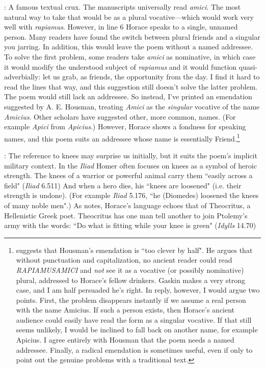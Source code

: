 : A famous textual crux.  The manuscripts universally read
\textit{amici}.  The most natural way to take that would be as a plural
vocative---which would work very well with \textit{rapiamus}.  However, in line
6 Horace speaks to a single, unnamed person.  Many readers have found the
switch between plural friends and a singular you jarring.  In addition, this
would leave the poem without a named addressee.  To solve the first problem,
some readers take \textit{amici} as nominative, in which case it would modify
the understood subject of \textit{rapiamus} and it would function
quasi-adverbially: let us grab, as friends, the opportunity from the day.
I find it hard to read the lines that way, and this suggestion still doesn't
solve the latter problem.  The poem would still lack an addressee.  So instead,
I've printed an emendation suggested by A. E. Housman, treating \textit{Amici}
as the \textit{singular} vocative of the name \textit{Amicius}.  Other scholars
have suggested other, more common, names.  (For example \textit{Apici} from
\textit{Apicius}.)  However, Horace shows a fondness for speaking names, and
this poem suits an addressee whose name is essentially
Friend.\footnote{\citet[205]{gaskin2013} suggests that Housman's emendation
is ``too clever by half".  He argues that without punctuation and
capitalization, no ancient reader could read \textit{RAPIAMUSAMICI} and
\textit{not} see it as a vocative (or possibly nominative) plural, addressed to
Horace's fellow drinkers.  Gaskin makes a very strong case, and I am half
persuaded he's right.  In reply, however, I would argue two points.  First, the
problem disappears instantly if we assume a real person with the name Amicius.
If such a person exists, then Horace's ancient audience could easily have read
the form as a singular vocative.  If that still seems unlikely, I would be
inclined to fall back on another name, for example Apicius.  I agree entirely
with Housman that the poem needs a named addressee.  Finally, a radical
emendation is sometimes useful, even if only to point out the genuine problems
with a traditional text.}


: The reference to knees may surprise us initially, but it
suits the poem's implicit military context.  In the \textit{Iliad} Homer often
focuses on knees as a symbol of heroic strength.  The knees of a warrior or
powerful animal carry them ``easily across a field" (\textit{Iliad} 6.511)  And
when a hero dies, his ``knees are loosened" (i.e. their strength is undone).
(For example \textit{Iliad} 5.176, ``he (Diomedes) loosened the knees of
many noble men".)  As \citet[216--217]{mankin1995} notes, Horace's language
echoes that of Theocritus, a Hellenistic Greek poet. Theocritus has one man
tell another to join Ptolemy's army with the words: ``Do what is fitting while
your knee is green" (\textit{Idylls} 14.70)


